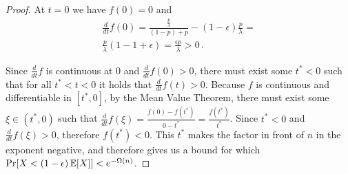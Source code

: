 \begin{proof}
  At $t = 0$ we have $f(0) = 0$ and
  \begin{align*}
    \frac{d}{dt} f(0) = \frac{\frac{p}{\lambda}}{(1 - p) + p} - (1 - \epsilon)\frac{p}{\lambda} =\\
    \frac{p}{\lambda}(1 - 1 + \epsilon) = \frac{\epsilon p}{\lambda} > 0\,.
  \end{align*}

  Since $\frac{d}{dt} f$ is continuous at $0$ and $\frac{d}{dt} f(0)>  0$, there must exist some $t^* < 0$ such that for all
  $t^* < t < 0$ it holds that $\frac{d}{dt} f(t) > 0$. Because $f$ is continuous and differentiable in $[t^*, 0]$,
  by the Mean Value Theorem, there must exist some $\xi \in (t^*, 0)$ such that
  $\frac{d}{dt} f(\xi) = \frac{f(0) - f(t^*)}{0 - t^*} = \frac{f(t^*)}{t^*}$.
  Since $t^* < 0$ and $\frac{d}{dt} f(\xi) > 0$, therefore $f(t^*) < 0$.
  This $t^*$ makes the factor in front of $n$ in the exponent negative, and therefore
  gives us a bound for which $\Pr[X < (1 - \epsilon)\mathop{{}\mathbb{E}}[X]] < e^{-\Omega(n)}$.
  \Qed
\end{proof}

